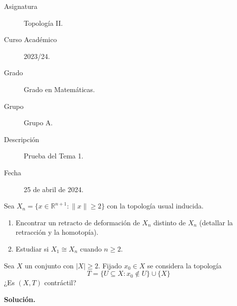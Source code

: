 \documentclass[12pt]{article}
\begin{document}

    
    

    \begin{description}
        \item[Asignatura] Topología II.
        \item[Curso Académico] 2023/24.
        \item[Grado] Grado en Matemáticas.
        \item[Grupo] Grupo A.
        \item[Descripción] Prueba del Tema 1.
        \item[Fecha] 25 de abril de 2024.
    \end{description}
    \newpage


    
    \begin{ejercicio}[7.5 puntos]
        Sea $X_n = \{x\in \mathbb{R}^{n+1} : \|x\| \geq 2\}$ con la topología usual inducida.
        \begin{enumerate}[label=\alph*)]
            \item Encontrar un retracto de deformación de $X_n$ distinto de $X_n$ (detallar la retracción y la homotopía).
            \item Estudiar si $X_1 \cong X_n$ cuando $n\geq 2$.
        \end{enumerate}
    \end{ejercicio}

    \begin{ejercicio}[2.5 puntos]
        Sea $X$ un conjunto con $|X|\geq 2$. Fijado $x_0\in X$ se considera la topología
        \begin{equation*}
            T = \{U\subseteq X : x_0\notin U\}\cup \{X\}
        \end{equation*}
        ¿Es $(X,T)$ contráctil?
    \end{ejercicio}

    \newpage
    \setcounter{ejercicio}{0} %
    \noindent
    \textbf{Solución.}
\end{document}
